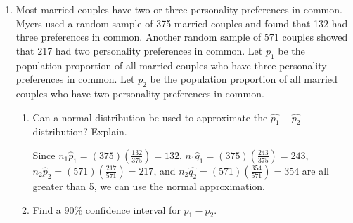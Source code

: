 \documentclass{article}
\newcommand{\answer}[1]{\color{red}#1}
\begin{document}
\begin{enumerate}
\begin{enumerate}
	{\answer Because we do not know the population standard deviation for at least one of the groups, we should use the Student's $t$ distribution.
	}  
	
	\item Find a 99\% confidence interval for $\mu_1 - \mu_2$.  
	
	{\answer Using \texttt{2-SampTInt} with the \texttt{Inpt: Data} option and $\texttt{List1:} L_1$ (for the 21 football players), $\texttt{List2:} L_2$ (for the 19 basketball players), \texttt{Freq1} and \texttt{Freq2} both 1, \texttt{C-Level: .99}, and \texttt{Pooled: No}, the interval is $(43.076, 64.583)$.
	}  
	
	\item Does the interval consist of numbers that are all positive? all negative? of different signs? At the 99\% confidence level, do professional football players tend to have a higher population mean weight than professional basketball players?  
	
	{\answer Because the interval contains only positive values, we are 99\% confident that the population mean weight of professional football players is greater than the population mean weight of professional basketball players.
	}  
	\end{enumerate}

\newpage
	
\item Most married couples have two or three personality preferences in common. Myers used a random sample of 375 married couples and found that 132 had three preferences in common. Another random sample of 571 couples showed that 217 had two personality preferences in common. Let $p_1$ be the population proportion of all married couples who have three personality preferences in common. Let $p_2$ be the population proportion of all married couples who have two personality preferences in common.
	\begin{enumerate}
	\item Can a normal distribution be used to approximate the $\hat{p_1}- \hat{p_2}$ distribution? Explain.  
	
	{\answer Since $n_1\hat{p}_1 = (375)(\frac{132}{375}) = 132$, $n_1\hat{q}_1 = (375)(\frac{243}{375}) = 243$, $n_2\hat{p}_2 = (571)(\frac{217}{571}) = 217$, and $n_2\hat{q_2} = (571)(\frac{354}{571}) = 354$ are all greater than 5, we can use the normal approximation.
	}  
	
	\item Find a 90\% confidence interval for $p_1 -p_2$.  
	

\end{enumerate}
\end{enumerate}
\end{document}
